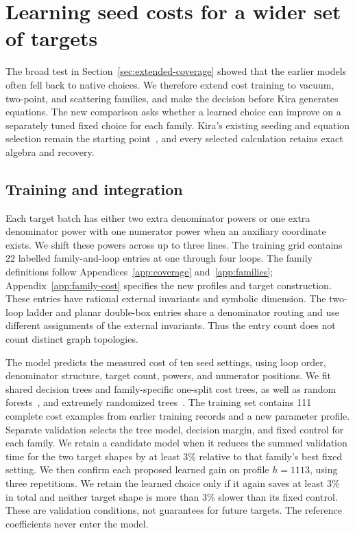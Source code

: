 \section{Learning seed costs for a wider set of targets}
\label{sec:family-cost}
The broad test in Section~\ref{sec:extended-coverage} showed that the earlier models often fell back to native choices. We therefore extend cost training to vacuum, two-point, and scattering families, and make the decision before Kira generates equations. The new comparison asks whether a learned choice can improve on a separately tuned fixed choice for each family. Kira's existing seeding and equation selection remain the starting point~\cite{Kira3}, and every selected calculation retains exact algebra and recovery.

\subsection{Training and integration}
Each target batch has either two extra denominator powers or one extra denominator power with one numerator power when an auxiliary coordinate exists. We shift these powers across up to three lines. The training grid contains 22 labelled family-and-loop entries at one through four loops. The family definitions follow Appendices~\ref{app:coverage} and~\ref{app:families}; Appendix~\ref{app:family-cost} specifies the new profiles and target construction. These entries have rational external invariants and symbolic dimension. The two-loop ladder and planar double-box entries share a denominator routing and use different assignments of the external invariants. Thus the entry count does not count distinct graph topologies.

The model predicts the measured cost of ten seed settings, using loop order, denominator structure, target count, powers, and numerator positions. We fit shared decision trees and family-specific one-split cost trees, as well as random forests~\cite{Breiman2001Forest}, and extremely randomized trees~\cite{Geurts2006ExtraTrees}. The training set contains 111 complete cost examples from earlier training records and a new parameter profile. Separate validation selects the tree model, decision margin, and fixed control for each family. We retain a candidate model when it reduces the summed validation time for the two target shapes by at least 3\% relative to that family's best fixed setting. We then confirm each proposed learned gain on profile $h=1113$, using three repetitions. We retain the learned choice only if it again saves at least 3\% in total and neither target shape is more than 3\% slower than its fixed control. These are validation conditions, not guarantees for future targets. The reference coefficients never enter the model.

